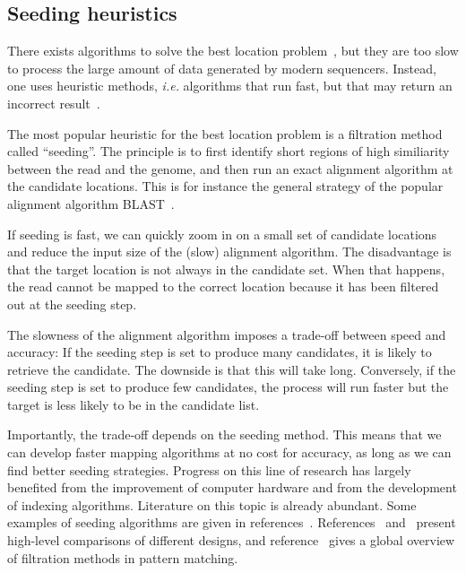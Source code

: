 \documentclass{article}
\begin{document}
\subsection{Seeding heuristics}
\label{sec:seedheur}

There exists algorithms to solve the best location
problem~\cite{pmid7265238,pmid5420325}, but they are too slow to process
the large amount of data generated by modern sequencers. Instead, one uses
heuristic methods, \textit{i.e.} algorithms that run fast, but that may
return an incorrect result~\cite{Waterman1984}.

The most popular heuristic for the best location problem is a filtration
method called ``seeding''. The principle is to first identify short
regions of high similiarity between the read and the genome, and then run
an exact alignment algorithm at the candidate locations. This is for
instance the general strategy of the popular alignment algorithm
BLAST~\cite{pmid2231712}.

If seeding is fast, we can quickly zoom in on a small set of candidate
locations and reduce the input size of the (slow) alignment algorithm. The
disadvantage is that the target location is not always in the candidate
set. When that happens, the read cannot be mapped to the correct location
because it has been filtered out at the seeding step.

The slowness of the alignment algorithm imposes a trade-off between speed
and accuracy: If the seeding step is set to produce many candidates, it is
likely to retrieve the candidate. The downside is that this will take
long. Conversely, if the seeding step is set to produce few candidates,
the process will run faster but the target is less likely to be in the
candidate list.

Importantly, the trade-off depends on the seeding method. This means that
we can develop faster mapping algorithms at no cost for accuracy, as long
as we can find better seeding strategies. Progress on this line of
research has largely benefited from the improvement of computer hardware
and from the development of indexing algorithms. Literature on this topic
is already abundant. Some examples of seeding algorithms are given in
references~\cite{sun2005designing, pmid11934743, xu2006optimizing,
kucherov2005multiseed, brejova2003vector, pmid18684737, pmid15359419}.
References~\cite{pmid16533404} and~\cite{pmid20460430} present high-level
comparisons of different designs, and reference~\cite{navarro2001guided}
gives a global overview of filtration methods in pattern matching.
\end{document}
